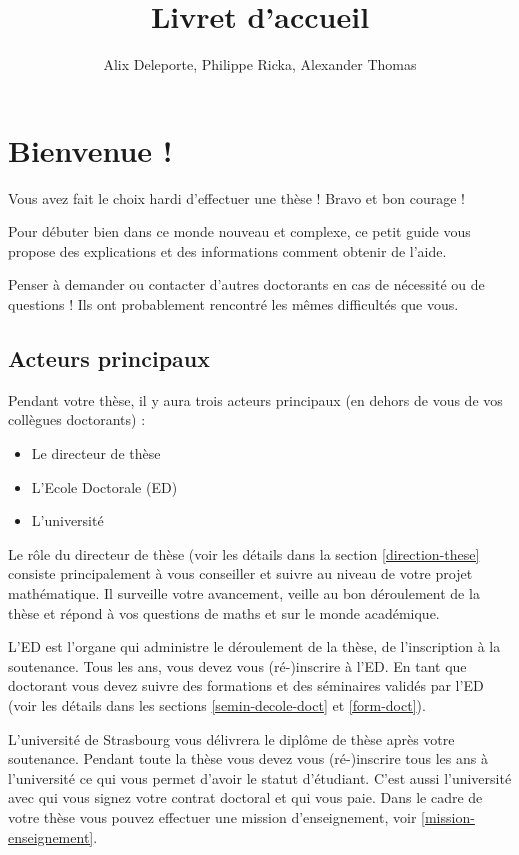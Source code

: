 \documentclass[a5paper]{article}
\title{Livret d'accueil}
\author{Alix Deleporte, Philippe Ricka, Alexander Thomas}
\date{}
\begin{document}
\maketitle

\tableofcontents

\section{Bienvenue !}
\label{sec:bienvenue-}

Vous avez fait le choix hardi d'effectuer une thèse ! Bravo et bon courage !

Pour débuter bien dans ce monde nouveau et complexe, ce petit guide vous propose des explications et des informations comment obtenir de l'aide.

Penser à demander ou contacter d'autres doctorants en cas de nécessité ou de questions ! Ils ont probablement rencontré les mêmes difficultés que vous.


\subsection{Acteurs principaux}
\label{sec:acteurs}

Pendant votre thèse, il y aura trois acteurs principaux (en dehors de vous de vos collègues doctorants) :
\begin{itemize}

\item Le directeur de thèse
\item L'Ecole Doctorale (ED)
\item L'université

\end{itemize}

Le rôle du directeur de thèse (voir les détails dans la section \ref{direction-these} consiste principalement à vous conseiller et suivre au niveau de votre projet mathématique. Il surveille votre avancement, veille au bon déroulement de la thèse et répond à vos questions de maths et sur le monde académique.

L'ED est l'organe qui administre le déroulement de la thèse, de l'inscription à la soutenance. Tous les ans, vous devez vous (ré-)inscrire à l'ED. En tant que doctorant vous devez suivre des formations et des séminaires validés par l'ED (voir les détails dans les sections \ref{semin-decole-doct} et \ref{form-doct}).

L'université de Strasbourg vous délivrera le diplôme de thèse après votre soutenance. Pendant toute la thèse vous devez vous (ré-)inscrire tous les ans à l'université ce qui vous permet d'avoir le statut d'étudiant. C'est aussi l'université avec qui vous signez votre contrat doctoral et qui vous paie. Dans le cadre de votre thèse vous pouvez effectuer une mission d'enseignement, voir \ref{mission-enseignement}.
\end{document}
